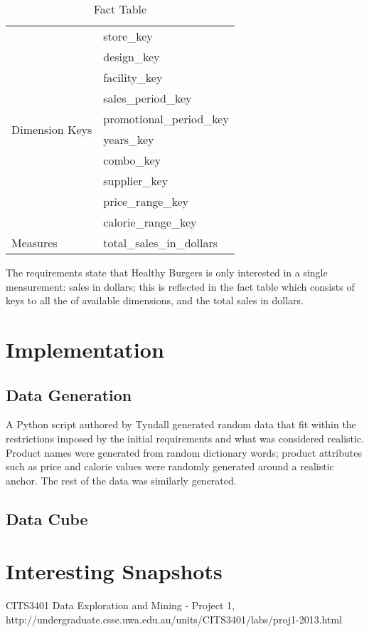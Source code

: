 \documentclass[12pt, a4paper]{article}
\begin{document}
\begin{table}
\begin{tabular}{| l | l |}
\hline
\multirow{10}{3cm}{Dimension Keys} & store\_key \\
	& design\_key \\ 
	& facility\_key \\
	& sales\_period\_key \\
	& promotional\_period\_key \\
	& years\_key \\
	& combo\_key \\
	& supplier\_key \\
	& price\_range\_key \\
	& calorie\_range\_key \\
\hline	

Measures & total\_sales\_in\_dollars \\
\hline

\end{tabular}

\caption{Fact Table}
\label{tab:fact}

\end{table}

The requirements state that Healthy Burgers is only interested in a single measurement: sales in dollars; this is reflected in the fact table which consists of keys to all the of available dimensions, and the total sales in dollars.

\section*{Implementation}

\subsection*{Data Generation}

A Python script authored by Tyndall generated random data that fit within the restrictions imposed by the initial requirements and what was considered realistic. Product names were generated from random dictionary words; product attributes such as price and calorie values were randomly generated around a realistic anchor. The rest of the data was similarly generated.

\subsection*{Data Cube}

\section*{Interesting Snapshots}



\begin{thebibliography}{9}

	CITS3401 Data Exploration and Mining - Project 1,
	http://undergraduate.csse.uwa.edu.au/units/CITS3401/labs/proj1-2013.html
		
\end{thebibliography}


\end{document}
